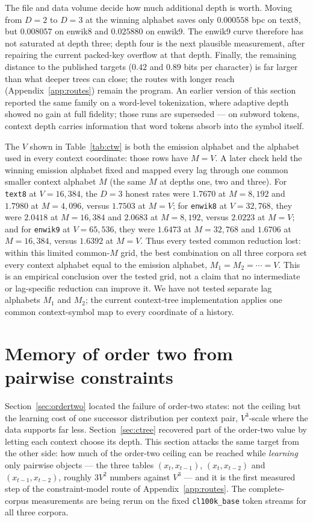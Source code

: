 \documentclass[11pt]{article}
\begin{document}
The file and data volume decide how much additional depth is worth.  Moving
from $D=2$ to $D=3$ at the winning alphabet saves only $0.000558$ bpc on
text8, but $0.008057$ on enwik8 and $0.025880$ on enwik9.  The enwik9 curve
therefore has not saturated at depth three; depth four is the next plausible
measurement, after repairing the current packed-key overflow at that depth.
Finally,
the remaining distance to the published targets ($0.42$ and $0.89$
bits per character) is far larger than what deeper trees can close;
the routes with longer reach (Appendix~\ref{app:routes}) remain the
program.  An earlier version of this section reported the same
family on a word-level tokenization, where adaptive depth showed no
gain at full fidelity; those runs are superseded --- on subword
tokens, context depth carries information that word tokens absorb
into the symbol itself.

The $V$ shown in Table~\ref{tab:ctw} is both the emission alphabet and the
alphabet used in every context coordinate: those rows have $M=V$.  A later
check held the winning emission alphabet fixed and mapped every lag through
one common smaller context alphabet $M$ (the same $M$ at depths one, two and
three).  For \texttt{text8} at $V=16{,}384$, the $D=3$ honest rates were
$1.7670$ at $M=8{,}192$ and $1.7980$ at $M=4{,}096$, versus $1.7503$ at
$M=V$; for \texttt{enwik8} at $V=32{,}768$, they were $2.0418$ at
$M=16{,}384$ and $2.0683$ at $M=8{,}192$, versus $2.0223$ at $M=V$; and for
\texttt{enwik9} at $V=65{,}536$, they were $1.6473$ at $M=32{,}768$ and
$1.6706$ at $M=16{,}384$, versus $1.6392$ at $M=V$.  Thus every tested common
reduction lost: within this limited common-$M$ grid, the best combination on
all three corpora set every context alphabet equal to the emission alphabet,
$M_1=M_2=\cdots=V$.  This is an empirical conclusion over the tested grid,
not a claim that no intermediate or lag-specific reduction can improve it.
We have not tested separate lag alphabets $M_1$ and $M_2$;
the current context-tree implementation applies one common context-symbol
map to every coordinate of a history.

\section{Memory of order two from pairwise constraints}
\label{sec:pairwise}

Section~\ref{sec:ordertwo} located the failure of order-two states:
not the ceiling but the learning cost of one successor distribution
per context pair, $V^3$-scale where the data supports far less.
Section~\ref{sec:ctree} recovered part of the order-two value by
letting each context choose its depth.  This section attacks the
same target from the other side: how much of the order-two ceiling
can be reached while \emph{learning} only pairwise objects --- the
three tables $(x_t, x_{t-1})$, $(x_t, x_{t-2})$ and
$(x_{t-1}, x_{t-2})$, roughly $3V^2$ numbers against $V^3$ --- and
it is the first measured step of the constraint-model route of
Appendix~\ref{app:routes}.  The complete-corpus measurements are being rerun
on the fixed \texttt{cl100k\_base} token streams for all three corpora.
\end{document}
